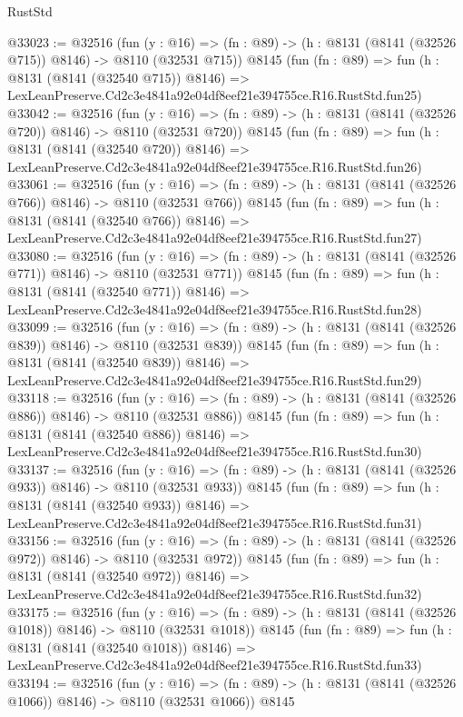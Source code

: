 \begin{lexlean}{RustStd}
\begin{coremodule}
@33023 := @32516
    (fun (y : @16) => (fn : @89) -> (h : @8131 (@8141 (@32526 @715)) @8146) -> @8110 (@32531 @715))
    @8145
    (fun (fn : @89) =>
    fun (h : @8131 (@8141 (@32540 @715)) @8146) =>
    LexLeanPreserve.Cd2c3e4841a92e04df8eef21e394755ce.R16.RustStd.fun25)
@33042 := @32516
    (fun (y : @16) => (fn : @89) -> (h : @8131 (@8141 (@32526 @720)) @8146) -> @8110 (@32531 @720))
    @8145
    (fun (fn : @89) =>
    fun (h : @8131 (@8141 (@32540 @720)) @8146) =>
    LexLeanPreserve.Cd2c3e4841a92e04df8eef21e394755ce.R16.RustStd.fun26)
@33061 := @32516
    (fun (y : @16) => (fn : @89) -> (h : @8131 (@8141 (@32526 @766)) @8146) -> @8110 (@32531 @766))
    @8145
    (fun (fn : @89) =>
    fun (h : @8131 (@8141 (@32540 @766)) @8146) =>
    LexLeanPreserve.Cd2c3e4841a92e04df8eef21e394755ce.R16.RustStd.fun27)
@33080 := @32516
    (fun (y : @16) => (fn : @89) -> (h : @8131 (@8141 (@32526 @771)) @8146) -> @8110 (@32531 @771))
    @8145
    (fun (fn : @89) =>
    fun (h : @8131 (@8141 (@32540 @771)) @8146) =>
    LexLeanPreserve.Cd2c3e4841a92e04df8eef21e394755ce.R16.RustStd.fun28)
@33099 := @32516
    (fun (y : @16) => (fn : @89) -> (h : @8131 (@8141 (@32526 @839)) @8146) -> @8110 (@32531 @839))
    @8145
    (fun (fn : @89) =>
    fun (h : @8131 (@8141 (@32540 @839)) @8146) =>
    LexLeanPreserve.Cd2c3e4841a92e04df8eef21e394755ce.R16.RustStd.fun29)
@33118 := @32516
    (fun (y : @16) => (fn : @89) -> (h : @8131 (@8141 (@32526 @886)) @8146) -> @8110 (@32531 @886))
    @8145
    (fun (fn : @89) =>
    fun (h : @8131 (@8141 (@32540 @886)) @8146) =>
    LexLeanPreserve.Cd2c3e4841a92e04df8eef21e394755ce.R16.RustStd.fun30)
@33137 := @32516
    (fun (y : @16) => (fn : @89) -> (h : @8131 (@8141 (@32526 @933)) @8146) -> @8110 (@32531 @933))
    @8145
    (fun (fn : @89) =>
    fun (h : @8131 (@8141 (@32540 @933)) @8146) =>
    LexLeanPreserve.Cd2c3e4841a92e04df8eef21e394755ce.R16.RustStd.fun31)
@33156 := @32516
    (fun (y : @16) => (fn : @89) -> (h : @8131 (@8141 (@32526 @972)) @8146) -> @8110 (@32531 @972))
    @8145
    (fun (fn : @89) =>
    fun (h : @8131 (@8141 (@32540 @972)) @8146) =>
    LexLeanPreserve.Cd2c3e4841a92e04df8eef21e394755ce.R16.RustStd.fun32)
@33175 := @32516
    (fun (y : @16) =>
    (fn : @89) -> (h : @8131 (@8141 (@32526 @1018)) @8146) -> @8110 (@32531 @1018))
    @8145
    (fun (fn : @89) =>
    fun (h : @8131 (@8141 (@32540 @1018)) @8146) =>
    LexLeanPreserve.Cd2c3e4841a92e04df8eef21e394755ce.R16.RustStd.fun33)
@33194 := @32516
    (fun (y : @16) =>
    (fn : @89) -> (h : @8131 (@8141 (@32526 @1066)) @8146) -> @8110 (@32531 @1066))
    @8145

\end{coremodule}
\end{lexlean}
